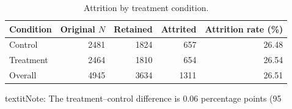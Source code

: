 \begin{table}

\caption{\label{tab:attrition-summary}Attrition by treatment condition.}
\centering
\begin{threeparttable}
\begin{tabular}[t]{lrrrr}
\toprule
Condition & Original $N$ & Retained & Attrited & Attrition rate (\%)\\
\midrule
Control & 2481 & 1824 & 657 & 26.48\\
Treatment & 2464 & 1810 & 654 & 26.54\\
Overall & 4945 & 3634 & 1311 & 26.51\\
\bottomrule
\end{tabular}
\begin{tablenotes}
\item textit{Note:} The treatment--control difference is 0.06 percentage points (95%
\end{tablenotes}
\end{threeparttable}
\end{table}
